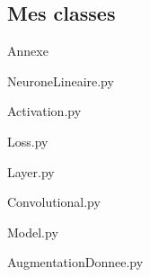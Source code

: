 \subsection{Mes classes}


\begin{frame}{Annexe}
    
\end{frame}


\begin{frame}{NeuroneLineaire.py}
    
\end{frame}


\begin{frame}[fragile]{Activation.py}
    
\end{frame}


\begin{frame}[fragile]{Loss.py}
    
\end{frame}


\begin{frame}{Layer.py}
    
\end{frame}


\begin{frame}{Convolutional.py}
    

\end{frame}


\begin{frame}{Model.py}
    
\end{frame}


\begin{frame}[fragile]{AugmentationDonnee.py}
    
\end{frame}



